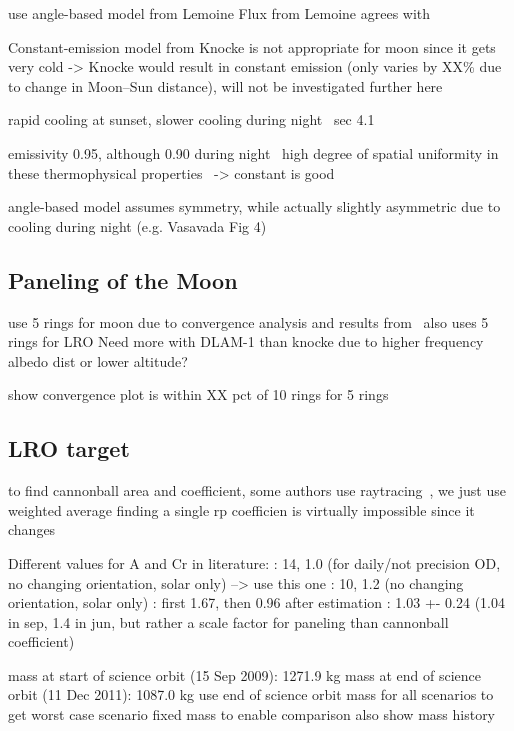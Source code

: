 use angle-based model from Lemoine
Flux from Lemoine agrees with \cite[Table~8]{Tooley2010}

Constant-emission model from Knocke is not appropriate for moon since it gets very cold -> Knocke would result in constant emission (only varies by XX\% due to change in Moon--Sun distance), will not be investigated further here

rapid cooling at sunset, slower cooling during night~\cite{Vasavada2012} sec 4.1

emissivity 0.95, although 0.90 during night~\cite{Bandfield2015}
high degree of spatial uniformity in these thermophysical properties~\cite{Hayne2017} -> constant is good

angle-based model assumes symmetry, while actually slightly asymmetric due to cooling during night (e.g. Vasavada Fig 4)

\subsection{Paneling of the Moon}

use 5 rings for moon due to convergence analysis and results from~\cite{Floberghagen1999}
\cite{Nicholson2010} also uses 5 rings for LRO
Need more with DLAM-1 than knocke due to higher frequency albedo dist or lower altitude?

show convergence plot
is within XX pct of 10 rings for 5 rings

\subsection{LRO target}

to find cannonball area and coefficient, some authors use raytracing~\cite{Hattori2019}, we just use weighted average
finding a single rp coefficien is virtually impossible since it changes~\cite[p~580]{Vallado2013}

Different values for A and Cr in literature:
\cite{Nicholson2010}: 14, 1.0 (for daily/not precision OD, no changing orientation, solar only) --> use this one
\cite{Bauer2016}: 10, 1.2 (no changing orientation, solar only)
\cite{Slojkowski2015}: first 1.67, then 0.96 after estimation
\cite{Mazarico2018}: 1.03 +- 0.24 (1.04 in sep, 1.4 in jun, but rather a scale factor for paneling than cannonball coefficient)

mass at start of science orbit (15 Sep 2009): 1271.9 kg
mass at end of science orbit (11 Dec 2011): 1087.0 kg
use end of science orbit mass for all scenarios to get worst case scenario
fixed mass to enable comparison
also show mass history

